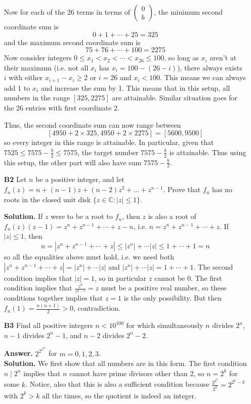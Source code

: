 \documentclass[11pt,a4paper]{article}
\newcommand{\<}{\langle}
\renewcommand{\>}{\rangle}
\begin{document}
\begin{enumerate}
	Now for each of the 26 terms in terms of $\begin{pmatrix}0\\b\end{pmatrix}$, the minimum second coordinate sum is 
	\[
	0+1+\cdots + 25 = 325
	\]
	and the maximum second coordinate sum is 
	\[
	75+76+\cdots + 100 = 2275
	\]
	Now consider integers $0\le x_1<x_2<\cdots < x_{26}\le 100$, so long as $x_i$ aren't at their maximum (i.e. not all $x_i$ has $x_i=100-(26-i)$), there always exists $i$ with either $x_{i+1}-x_i\ge 2$ or $i=26$ and $x_i<100$. This means we can always add 1 to $x_i$ and increase the sum by 1. This means that in this setup, all numbers in the range $[325, 2275]$ are attainable. Similar situation goes for the 26 entries with first coordinate 2. 
	
	Thus, the second coordinate sum can now range between 
	\[
	[4950+2\times 325, 4950+2\times 2275] = [5600, 9500]
	\]
	so every integer in this range is attainable. In particular, given that $7525\le 7575-\frac b2 \le 7575$, the target number $7575-\frac b2$ is attainable. Thus using this setup, the other part will also have sum $7575-\frac b2$. 
	
	\item [\textbf{B2}]
	Let $n$ be a positive integer, and let $f_n(z) = n + (n-1)z + (n-2)z^2 + \dots + z^{n-1}$. Prove that $f_n$ has no roots in the closed unit disk $\{z \in \mathbb{C}: |z| \le 1\}$.
	
	\textbf{Solution.} 
	If $z$ were to be a root to $f_n$, then $z$ is also a root of 
	$f_n(z)(z-1)=z^n+z^{n-1}+\cdots + z - n$, i.e. 
	$n=z^n+z^{n-1}+\cdots + z$. 
	If $|z|\le 1$, then 
	\[n=|z^n+z^{n-1}+\cdots + z|
	\le |z^n|+\cdots |z|
	\le 1+\cdots + 1
	=n
	\]
	so all the equalities above must hold, i.e. we need both $|z^n+z^{n-1}+\cdots + z| = |z^n|+\cdots |z|$ and 
	$|z^n|+\cdots |z|=1+\cdots +1$. The second condition implies that $|z|=1$, so in particular $z$ cannot be 0. 
	The first condition implies that $\frac{z^k}{z^{k-1}}=z$ must be a positive real number, so these conditions together implies that $z=1$ is the only possibility. 
	But then $f_n(1)=\frac{n(n+1)}{2}>0$, contradiction. 
	
	\item[\textbf{B3}] Find all positive integers $n < 10^{100}$ for which simultaneously $n$ divides $2^n$, $n-1$ divides $2^n - 1$, and $n-2$ divides $2^n - 2$.
	
	\textbf{Answer.} $2^{2^{2^m}}$ for $m=0,1,2,3$. \\
	\textbf{Solution.} We first show that all numbers are in this form. The first condition $n\mid 2^n$ implies that $n$ cannot have prime divisors other than 2, so $n=2^k$ for some $k$. Notice, also that this is also a sufficient condition because $\frac{2^{2^k}}{2^k}=2^{2^k-k}$ with $2^k>k$ all the times, so the quotient is indeed an integer.  
	

\end{enumerate}
\end{document}
